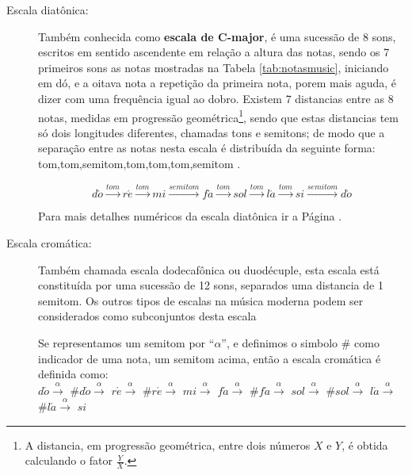\begin{description}

\item [Escala diatônica:] \label{sec:pos:Diatonica}
Também conhecida como \textbf{escala de C-major},
é uma sucessão de 8 sons,  escritos em sentido ascendente em relação a altura das notas, 
sendo os 7 primeiros sons as notas mostradas na Tabela \ref{tab:notasmusic}, iniciando em dó,
e a oitava nota a repetição da primeira nota, 
porem mais aguda, é dizer com uma frequência igual ao dobro.
Existem 7 distancias entre as 8 notas, medidas em progressão geométrica\footnote{A 
distancia, em progressão geométrica, entre dois números $X$ e $Y$, é obtida calculando o fator $\frac{Y}{X}$. }, 
sendo que estas distancias tem só dois longitudes diferentes, chamadas tons e semitons;
de modo que a separação entre as notas nesta escala é distribuída da seguinte forma: 
tom,tom,semitom,tom,tom,tom,semitom \cite[pp. 30]{cardoso1973curso}\cite[pp. 753]{apel1969harvard}.
\begin{example}
\begin{equation*}
d\acute{o}\overset{tom}{\rightarrow}
r\acute{e}\overset{tom}{\rightarrow}
mi\overset{semitom}{\rightarrow}
f\acute{a}\overset{tom}{\rightarrow}
sol\overset{tom}{\rightarrow}
l\acute{a}\overset{tom}{\rightarrow}
si\overset{semitom}{\rightarrow}
d\acute{o}
\end{equation*}
\end{example}
Para mais detalhes numéricos da escala diatônica ir a Página \pageref{ref:paginadiatonicanumerica}.


\item [Escala cromática:] \label{sec:pos:Cromatica}
Também chamada escala dodecafônica ou duodécuple, 
esta escala está constituída por uma sucessão de 12 sons, separados uma distancia de 1 semitom.
Os outros tipos de escalas na música moderna podem ser considerados como subconjuntos desta escala \cite[pp. 753]{apel1969harvard}
\begin{example} 
Se representamos um semitom por ``$\alpha$'', 
e definimos o simbolo $\#$ como indicador de uma nota, um semitom acima, 
então a escala cromática é definida como:\\
$d\acute{o}\overset{\alpha}{\rightarrow}$
$\#d\acute{o}\overset{\alpha}{\rightarrow}$
$r\acute{e}\overset{\alpha}{\rightarrow}$
$\#r\acute{e}\overset{\alpha}{\rightarrow}$
$mi\overset{\alpha}{\rightarrow}$
$f\acute{a}\overset{\alpha}{\rightarrow}$
$\#f\acute{a}\overset{\alpha}{\rightarrow}$
$sol\overset{\alpha}{\rightarrow}$
$\#sol\overset{\alpha}{\rightarrow}$
$l\acute{a}\overset{\alpha}{\rightarrow}$
$\#l\acute{a}\overset{\alpha}{\rightarrow}$
$si$
\end{example}
\end{description}


